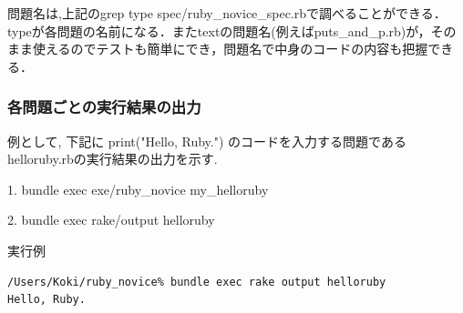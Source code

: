 問題名は,上記のgrep type spec/ruby\_novice\_spec.rbで調べることができる．
typeが各問題の名前になる．またtextの問題名(例えばputs\_and\_p.rb)が，そのまま使えるのでテストも簡単にでき，問題名で中身のコードの内容も把握できる．

\subsubsection{各問題ごとの実行結果の出力}
例として, 下記に print("Hello, Ruby.") のコードを入力する問題であるhelloruby.rbの実行結果の出力を示す.

1. bundle exec exe/ruby\_novice my\_helloruby

2. bundle exec rake/output helloruby

実行例
\begin{lstlisting}[style=customRuby,basicstyle={\scriptsize\ttfamily}]
/Users/Koki/ruby_novice% bundle exec rake output helloruby
Hello, Ruby.
\end{lstlisting}
